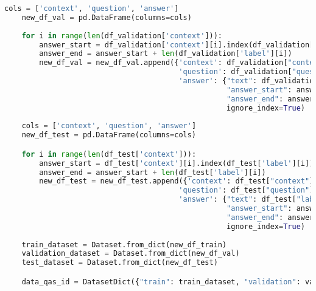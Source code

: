 \begin{lstlisting}[language=Python, caption=Mengimpor \emph{dataset} sistem tanya jawab]
    cols = ['context', 'question', 'answer']
    new_df_val = pd.DataFrame(columns=cols)    
        
    for i in range(len(df_validation['context'])):
        answer_start = df_validation['context'][i].index(df_validation['label'][i])
        answer_end = answer_start + len(df_validation['label'][i])
        new_df_val = new_df_val.append({'context': df_validation["context"][i], 
                                        'question': df_validation["question"][i], 
                                        'answer': {"text": df_validation["label"][i], 
                                                   "answer_start": answer_start, 
                                                   "answer_end": answer_end}}, 
                                                   ignore_index=True)    
        
    cols = ['context', 'question', 'answer']
    new_df_test = pd.DataFrame(columns=cols)

    for i in range(len(df_test['context'])):
        answer_start = df_test['context'][i].index(df_test['label'][i])
        answer_end = answer_start + len(df_test['label'][i])
        new_df_test = new_df_test.append({'context': df_test["context"][i], 
                                        'question': df_test["question"][i], 
                                        'answer': {"text": df_test["label"][i], 
                                                   "answer_start": answer_start, 
                                                   "answer_end": answer_end}}, 
                                                   ignore_index=True)
    
    train_dataset = Dataset.from_dict(new_df_train)
    validation_dataset = Dataset.from_dict(new_df_val)
    test_dataset = Dataset.from_dict(new_df_test)

    data_qas_id = DatasetDict({"train": train_dataset, "validation": validation_dataset, "test": test_dataset})
\end{lstlisting}

